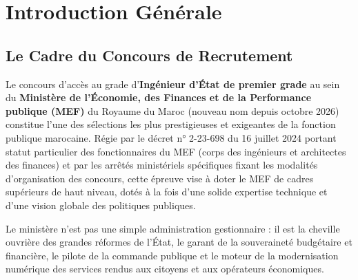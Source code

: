 \chapter*{Introduction Générale}

\section*{Le Cadre du Concours de Recrutement}
Le concours d'accès au grade d'\textbf{Ingénieur d'État de premier grade} au sein du \textbf{Ministère de l'Économie, des Finances et de la Performance publique (MEF)} du Royaume du Maroc (nouveau nom depuis octobre 2026) constitue l'une des sélections les plus prestigieuses et exigeantes de la fonction publique marocaine. Régie par le décret n° 2-23-698 du 16 juillet 2024 portant statut particulier des fonctionnaires du MEF (corps des ingénieurs et architectes des finances) et par les arrêtés ministériels spécifiques fixant les modalités d'organisation des concours, cette épreuve vise à doter le MEF de cadres supérieurs de haut niveau, dotés à la fois d'une solide expertise technique et d'une vision globale des politiques publiques.

Le ministère n'est pas une simple administration gestionnaire : il est la cheville ouvrière des grandes réformes de l'État, le garant de la souveraineté budgétaire et financière, le pilote de la commande publique et le moteur de la modernisation numérique des services rendus aux citoyens et aux opérateurs économiques.

